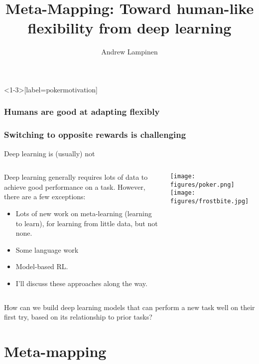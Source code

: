 \documentclass{beamer}
\begin{document}
\title{Meta-Mapping: Toward human-like flexibility from deep learning}
\author{Andrew Lampinen}
\date{}
\frame{\titlepage}

\begin{frame}<1-3>[label=pokermotivation]
\frametitle<1-4>{Humans are good at adapting flexibly}
\frametitle<5>{Switching to opposite rewards is challenging}
\centering
{}
\end{frame}

\begin{frame}{Deep learning is (usually) not}
\begin{columns}
\begin{column}{0.5\textwidth}
Deep learning generally requires lots of data to achieve good performance on a task. However, there are a few exceptions:
\begin{itemize}[<+(2)->]
    \item Lots of new work on meta-learning (learning to learn), for learning from little data, but not none.
    \item Some language work
    \item Model-based RL. 
    \item I'll discuss these approaches along the way. 
\end{itemize}
\end{column}

\begin{column}{0.5\textwidth}
\texttt{[image: figures/poker.png]}
\texttt{[image: figures/frostbite.jpg]}
\end{column}
\end{columns}
\end{frame}

\begin{frame}[standout]
How can we build deep learning models that can perform a new task well on their first try, based on its relationship to prior tasks?
\end{frame}

\section{Meta-mapping}
\end{document}
